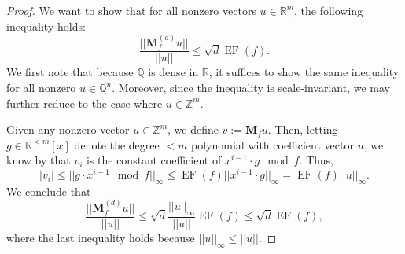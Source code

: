 \documentclass[11pt]{article}
\newcommand{\poly}[2]{{#1}^{<#2}[x]}
\newcommand{\Z}{\mathbb{Z}}
\newcommand{\R}{\mathbb{R}}
\newcommand{\dabs}[1]{||#1 ||}
\DeclareMathOperator{\ef}{EF}
\begin{document}
\begin{proof}
We want to show that for all nonzero vectors $u\in \R^m$, the following inequality holds:
\[
\frac{\dabs{\textbf{M}_f^{(d)} u}}{\dabs{u}} \leq \sqrt{d} \ef(f).
\]
We first note that because $\mathbb Q$ is dense in $\R$, it suffices to show the same inequality for all nonzero $u\in \mathbb Q^n$. Moreover, since the inequality is scale-invariant, we may further reduce to the case where $u\in \Z^m$. 

Given any nonzero vector $u\in \Z^m$, we define $v := \textbf{M}_f u$. Then, letting $g\in \poly{\R}{m}$ denote the degree $<m$ polynomial with coefficient vector $u$, we know by \autocite[Lemma 2.4]{MPLWE} that $v_i$ is the constant coefficient of $x^{i-1}\cdot g \mod f$.  Thus,
\[ |v_i| \leq \dabs{g \cdot x^{i-1} \mod f}_{\infty} \leq \ef(f) \dabs{x^{i-1}\cdot g}_{\infty} = \ef(f) \dabs{u}_{\infty}.
\]
We conclude that 
\[
\frac{\dabs{\textbf{M}_f^{(d)} u}}{\dabs{u}} \leq \sqrt{d} \frac{\dabs{u}_{\infty}}{\dabs{u}} \ef(f) \leq \sqrt{d} \ef(f),
\]
where the last inequality holds because $\dabs{u}_{\infty}\leq \dabs{u}.$
\end{proof} 
\end{document}
